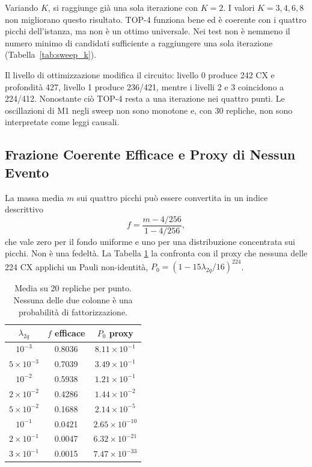 \begin{onehalfspace}
Variando $K$, si raggiunge già una sola iterazione con $K=2$. I valori $K=3,4,6,8$ non migliorano questo risultato. TOP-4 funziona bene ed è coerente con i quattro picchi dell'istanza, ma non è un ottimo universale. Nei test non è nemmeno il numero minimo di candidati sufficiente a raggiungere una sola iterazione (Tabella~\ref{tab:sweep_k}).

Il livello di ottimizzazione modifica il circuito: livello 0 produce 242
CX e profondità 427, livello 1 produce 236/421, mentre i livelli 2 e 3
coincidono a 224/412. Nonostante ciò TOP-4 resta a una iterazione nei
quattro punti. Le oscillazioni di M1 negli sweep non sono monotone e, con
30 repliche, non sono interpretate come leggi causali.

\subsection{Frazione Coerente Efficace e Proxy di Nessun Evento}
\label{subsec:frazione_coerente}

La massa media $m$ sui quattro picchi può essere convertita in un indice
descrittivo
\begin{equation}
    f=\frac{m-4/256}{1-4/256},
    \label{eq:miscela_coerente}
\end{equation}
che vale zero per il fondo uniforme e uno per una distribuzione
concentrata sui picchi. Non è una fedeltà. La Tabella
\ref{tab:frazione_coerente} la confronta con il proxy che nessuna delle
224 CX applichi un Pauli non-identità,
$P_0=(1-15\lambda_{2q}/16)^{224}$.

\begin{table}[H]
\centering
\caption[Frazione efficace e proxy di nessun evento 2Q]{Media su 20
repliche per punto. Nessuna delle due colonne è una probabilità di
fattorizzazione.}
\label{tab:frazione_coerente}
\begin{tabular}{ccc}
\toprule
$\lambda_{2q}$ & $f$ efficace & $P_0$ proxy \\
\midrule
$10^{-3}$ & 0.8036 & $8.11\times10^{-1}$ \\
$5\times10^{-3}$ & 0.7039 & $3.49\times10^{-1}$ \\
$10^{-2}$ & 0.5938 & $1.21\times10^{-1}$ \\
$2\times10^{-2}$ & 0.4286 & $1.44\times10^{-2}$ \\
$5\times10^{-2}$ & 0.1688 & $2.14\times10^{-5}$ \\
$10^{-1}$ & 0.0421 & $2.65\times10^{-10}$ \\
$2\times10^{-1}$ & 0.0047 & $6.32\times10^{-21}$ \\
$3\times10^{-1}$ & 0.0015 & $7.47\times10^{-33}$ \\
\bottomrule
\end{tabular}
\end{table}


\end{onehalfspace}
